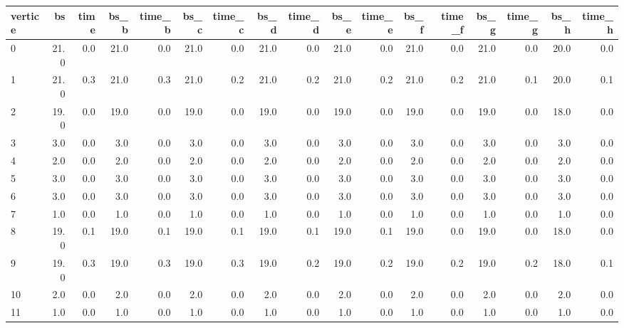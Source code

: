 \begin{tabular}{lrrrrrrrrrrrrrrrr}
\toprule
vertice &    bs &  time &  bs\_b &  time\_b &  bs\_c &  time\_c &  bs\_d &  time\_d &  bs\_e &  time\_e &  bs\_f &  time\_f &  bs\_g &  time\_g &  bs\_h &  time\_h \\
\midrule
      0 &  21.0 &   0.0 &  21.0 &     0.0 &  21.0 &     0.0 &  21.0 &     0.0 &  21.0 &     0.0 &  21.0 &     0.0 &  21.0 &     0.0 &  20.0 &     0.0 \\
      1 &  21.0 &   0.3 &  21.0 &     0.3 &  21.0 &     0.2 &  21.0 &     0.2 &  21.0 &     0.2 &  21.0 &     0.2 &  21.0 &     0.1 &  20.0 &     0.1 \\
      2 &  19.0 &   0.0 &  19.0 &     0.0 &  19.0 &     0.0 &  19.0 &     0.0 &  19.0 &     0.0 &  19.0 &     0.0 &  19.0 &     0.0 &  18.0 &     0.0 \\
      3 &   3.0 &   0.0 &   3.0 &     0.0 &   3.0 &     0.0 &   3.0 &     0.0 &   3.0 &     0.0 &   3.0 &     0.0 &   3.0 &     0.0 &   3.0 &     0.0 \\
      4 &   2.0 &   0.0 &   2.0 &     0.0 &   2.0 &     0.0 &   2.0 &     0.0 &   2.0 &     0.0 &   2.0 &     0.0 &   2.0 &     0.0 &   2.0 &     0.0 \\
      5 &   3.0 &   0.0 &   3.0 &     0.0 &   3.0 &     0.0 &   3.0 &     0.0 &   3.0 &     0.0 &   3.0 &     0.0 &   3.0 &     0.0 &   3.0 &     0.0 \\
      6 &   3.0 &   0.0 &   3.0 &     0.0 &   3.0 &     0.0 &   3.0 &     0.0 &   3.0 &     0.0 &   3.0 &     0.0 &   3.0 &     0.0 &   3.0 &     0.0 \\
      7 &   1.0 &   0.0 &   1.0 &     0.0 &   1.0 &     0.0 &   1.0 &     0.0 &   1.0 &     0.0 &   1.0 &     0.0 &   1.0 &     0.0 &   1.0 &     0.0 \\
      8 &  19.0 &   0.1 &  19.0 &     0.1 &  19.0 &     0.1 &  19.0 &     0.1 &  19.0 &     0.1 &  19.0 &     0.0 &  19.0 &     0.0 &  18.0 &     0.0 \\
      9 &  19.0 &   0.3 &  19.0 &     0.3 &  19.0 &     0.3 &  19.0 &     0.2 &  19.0 &     0.2 &  19.0 &     0.2 &  19.0 &     0.2 &  18.0 &     0.1 \\
     10 &   2.0 &   0.0 &   2.0 &     0.0 &   2.0 &     0.0 &   2.0 &     0.0 &   2.0 &     0.0 &   2.0 &     0.0 &   2.0 &     0.0 &   2.0 &     0.0 \\
     11 &   1.0 &   0.0 &   1.0 &     0.0 &   1.0 &     0.0 &   1.0 &     0.0 &   1.0 &     0.0 &   1.0 &     0.0 &   1.0 &     0.0 &   1.0 &     0.0 \\

\end{tabular}
